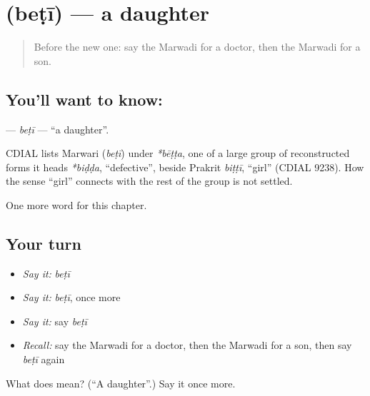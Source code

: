 \section[\texorpdfstring{\mw{बेटी} (beṭī)}{बेटी (beṭī)}]{ (beṭī) — a daughter}

\label{lesson:MW-C48-beti}



\begin{quote}
Before the new one: say the Marwadi for a doctor, then the Marwadi for a son.
\end{quote}

\subsection*{You'll want to know: }
\textbf{} — \emph{beṭī} — \textquotedblleft{}a daughter\textquotedblright{}.

\begin{cousinweb}
CDIAL lists Marwari \textbf{} (\emph{beṭī}) under \emph{*bēṭṭa}, one of a large group of reconstructed forms it heads \emph{*biḍḍa}, \textquotedblleft{}defective\textquotedblright{}, beside Prakrit \emph{biṭṭī}, \textquotedblleft{}girl\textquotedblright{} (CDIAL 9238). How the sense \textquotedblleft{}girl\textquotedblright{} connects with the rest of the group is not settled.
\end{cousinweb}

\begin{grammarlens}[title={What you've built}]
One more word for this chapter.
\end{grammarlens}

\subsection*{Your turn}
\begin{itemize}
\raggedright
  \item \emph{Say it:} \emph{beṭī}
  \item \emph{Say it:} \emph{beṭī}, once more
  \item \emph{Say it:} say \emph{beṭī}
  \item \emph{Recall:} say the Marwadi for a doctor, then the Marwadi for a son, then say \emph{beṭī} again
\end{itemize}

\begin{tcolorbox}[breakable,colback=teal!4,colframe=teal!35!black,title={Before you move on}]
What does  mean? (\textquotedblleft{}A daughter\textquotedblright{}.) Say it once more.
\end{tcolorbox}
